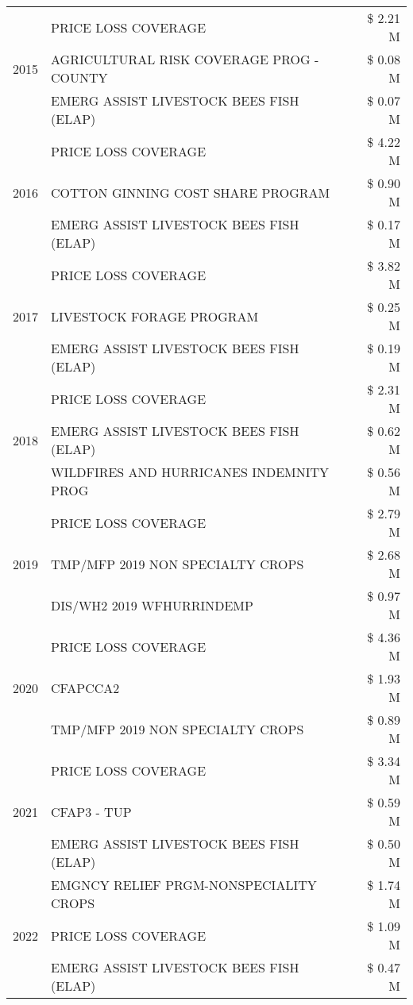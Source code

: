 \begin{tabular}{llr}
\cline{1-3}
\multirow[t]{3}{*}{2015} & PRICE LOSS COVERAGE & \$ 2.21 M \\
 & AGRICULTURAL RISK COVERAGE PROG - COUNTY & \$ 0.08 M \\
 & EMERG ASSIST LIVESTOCK BEES FISH (ELAP) & \$ 0.07 M \\
\cline{1-3}
\multirow[t]{3}{*}{2016} & PRICE LOSS COVERAGE & \$ 4.22 M \\
 & COTTON GINNING COST SHARE PROGRAM & \$ 0.90 M \\
 & EMERG ASSIST LIVESTOCK BEES FISH (ELAP) & \$ 0.17 M \\
\cline{1-3}
\multirow[t]{3}{*}{2017} & PRICE LOSS COVERAGE & \$ 3.82 M \\
 & LIVESTOCK FORAGE PROGRAM & \$ 0.25 M \\
 & EMERG ASSIST LIVESTOCK BEES FISH (ELAP) & \$ 0.19 M \\
\cline{1-3}
\multirow[t]{3}{*}{2018} & PRICE LOSS COVERAGE & \$ 2.31 M \\
 & EMERG ASSIST LIVESTOCK BEES FISH (ELAP) & \$ 0.62 M \\
 & WILDFIRES AND HURRICANES INDEMNITY PROG & \$ 0.56 M \\
\cline{1-3}
\multirow[t]{3}{*}{2019} & PRICE LOSS COVERAGE & \$ 2.79 M \\
 & TMP/MFP 2019 NON SPECIALTY CROPS & \$ 2.68 M \\
 & DIS/WH2 2019 WFHURRINDEMP & \$ 0.97 M \\
\cline{1-3}
\multirow[t]{3}{*}{2020} & PRICE LOSS COVERAGE & \$ 4.36 M \\
 & CFAPCCA2 & \$ 1.93 M \\
 & TMP/MFP 2019 NON SPECIALTY CROPS & \$ 0.89 M \\
\cline{1-3}
\multirow[t]{3}{*}{2021} & PRICE LOSS COVERAGE & \$ 3.34 M \\
 & CFAP3 - TUP & \$ 0.59 M \\
 & EMERG ASSIST LIVESTOCK BEES FISH (ELAP) & \$ 0.50 M \\
\cline{1-3}
\multirow[t]{3}{*}{2022} & EMGNCY RELIEF PRGM-NONSPECIALITY CROPS & \$ 1.74 M \\
 & PRICE LOSS COVERAGE & \$ 1.09 M \\
 & EMERG ASSIST LIVESTOCK BEES FISH (ELAP) & \$ 0.47 M \\
\cline{1-3}
\bottomrule
\end{tabular}
